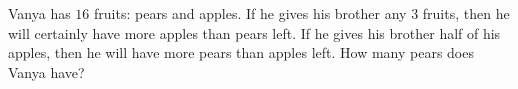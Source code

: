 Vanya has $16$ fruits: pears and apples. If he gives his brother any $3$ fruits, then he will certainly have more apples than pears left. If he gives his brother half of his apples, then he will have more pears than apples left. How many pears does Vanya have?
